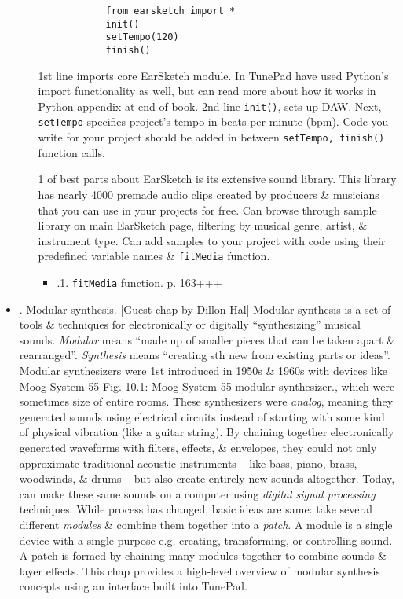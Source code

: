 \documentclass{article}
\begin{document}
\begin{itemize}
\begin{itemize}
		\begin{verbatim}
			from earsketch import *
			init()
			setTempo(120)
			finish()
		\end{verbatim}
		1st line imports core EarSketch module. In TunePad have used Python's import functionality as well, but can read more about how it works in Python appendix at end of book. 2nd line {\tt init()}, sets up DAW. Next, {\tt setTempo} specifies project's tempo in beats per minute (bpm). Code you write for your project should be added in between {\tt setTempo, finish()} function calls.
		
		1 of best parts about EarSketch is its extensive sound library. This library has nearly 4000 premade audio clips created by producers \& musicians that you can use in your projects for free. Can browse through sample library on main EarSketch page, filtering by musical genre, artist, \& instrument type. Can add samples to your project with code using their predefined variable names \& {\tt fitMedia} function.
		\begin{itemize}
			\item {.1. {\tt fitMedia} function.} p. 163+++
		\end{itemize}
	\end{itemize}
	\item {. Modular synthesis.} [Guest chap by {\sc Dillon Hal}] Modular synthesis is a set of tools \& techniques for electronically or digitally ``synthesizing'' musical sounds. {\it Modular} means ``made up of smaller pieces that can be taken apart \& rearranged''. {\it Synthesis} means ``creating sth new from existing parts or ideas''. Modular synthesizers  were 1st introduced in 1950s \& 1960s with devices like Moog System 55 {\sf Fig. 10.1: Moog System 55 modular synthesizer.}, which were sometimes size of entire rooms. These synthesizers were {\it analog}, meaning they generated sounds using electrical circuits instead of starting with some kind of physical vibration (like a guitar string). By chaining together electronically generated waveforms with filters, effects, \& envelopes, they could not only approximate traditional acoustic instruments -- like bass, piano, brass, woodwinds, \& drums -- but also create entirely new sounds altogether. Today, can make these same sounds on a computer using {\it digital signal processing} techniques. While process has changed, basic ideas are same: take several different {\it modules} \& combine them together into a {\it patch}. A module is a single device with a single purpose e.g. creating, transforming, or controlling sound. A patch is formed by chaining many modules together to combine sounds \& layer effects. This chap provides a high-level overview of modular synthesis concepts using an interface built into TunePad.

\end{itemize}
\end{document}
